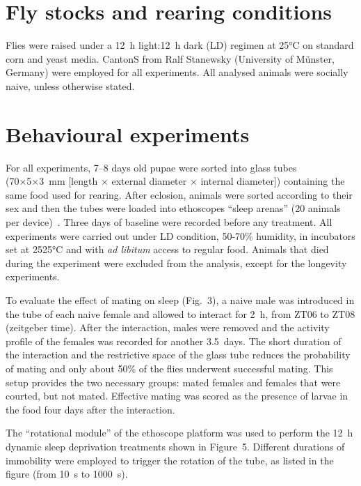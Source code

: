 \documentclass[a4paper,twoside,openright]{article}
\begin{document}
\section*{Fly stocks and rearing conditions}
Flies were raised under a 12~h light:12~h dark (LD) regimen at 25°C on standard corn and yeast media.
CantonS from Ralf Stanewsky (University of Münster, Germany) were employed for all experiments.
All analysed animals were socially naive, unless otherwise stated.

\section*{Behavioural experiments}

For all experiments, 7--8 days old pupae were sorted into glass tubes (70×5×3 mm [length × external diameter × internal diameter]) containing the same food used for rearing.
After eclosion, animals were sorted according to their sex and then the tubes were loaded into ethoscopes ``sleep arenas'' (20 animals per device)~\cite{geissmann_ethoscopes:_2017}. Three days of baseline were recorded before any treatment.
All experiments were carried out under LD condition, 50-70\% humidity, in incubators set at 2525°C and with \emph{ad libitum} access to regular food.
Animals that died during the experiment were excluded from the analysis, except for the longevity experiments. 

To evaluate the effect of mating on sleep (Fig.~3), a naive male was introduced in the tube of each naive female and allowed to interact for 2~h, from ZT06 to ZT08 (zeitgeber time). 
After the interaction, males were removed and the activity profile of the females was recorded for another 3.5~days.
The short duration of the interaction and the restrictive space of the glass tube reduces the probability of mating and only about 50\% of the flies underwent successful mating.
This setup provides the two necessary groups: mated females and females that were courted, but not mated.
Effective mating was scored as the presence of larvae in the food four days after the interaction. 

The ``rotational module'' of the ethoscope platform was used to perform the 12~h dynamic sleep deprivation treatments shown in Figure~5.
Different durations of immobility were employed to trigger the rotation of the tube, as listed in the figure (from 10~s to 1000~s).
\end{document}
